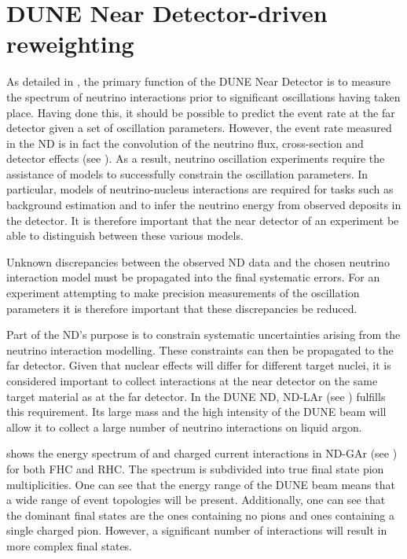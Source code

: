 \chapter{DUNE Near Detector-driven reweighting}
\label{sec:dune_ndrwt}

As detailed in , the primary function of the DUNE Near Detector is to measure the spectrum of neutrino interactions prior to significant oscillations having taken place.
Having done this, it should be possible to predict the event rate at the far detector given a set of oscillation parameters.
However, the event rate measured in the ND is in fact the convolution of the neutrino flux, cross-section and detector effects (see ).
As a result, neutrino oscillation experiments require the assistance of models to successfully constrain the oscillation parameters.
In particular, models of neutrino-nucleus interactions are required for tasks such as background estimation and to infer the neutrino energy from observed deposits in the detector.
It is therefore important that the near detector of an experiment be able to distinguish between these various models.

Unknown discrepancies between the observed ND data and the chosen neutrino interaction model must be propagated into the final systematic errors.
For an experiment attempting to make precision measurements of the oscillation parameters it is therefore important that these discrepancies be reduced.

Part of the ND's purpose is to constrain systematic uncertainties arising from the neutrino interaction modelling.
These constraints can then be propagated to the far detector.
Given that nuclear effects will differ for different target nuclei, it is considered important to collect interactions at the near detector on the same target material as at the far detector.
In the DUNE ND, ND-LAr (see ) fulfills this requirement.
Its large mass and the high intensity of the DUNE beam will allow it to collect a large number of neutrino interactions on liquid argon.


 shows the energy spectrum of \numu and \anumu charged current interactions in ND-GAr (see ) for both FHC and RHC.
The spectrum is subdivided into true final state pion multiplicities. 
One can see that the energy range of the DUNE beam means that a wide range of event topologies will be present.
Additionally, one can see that the dominant final states are the ones containing no pions and ones containing a single charged pion.
However, a significant number of interactions will result in more complex final states.

